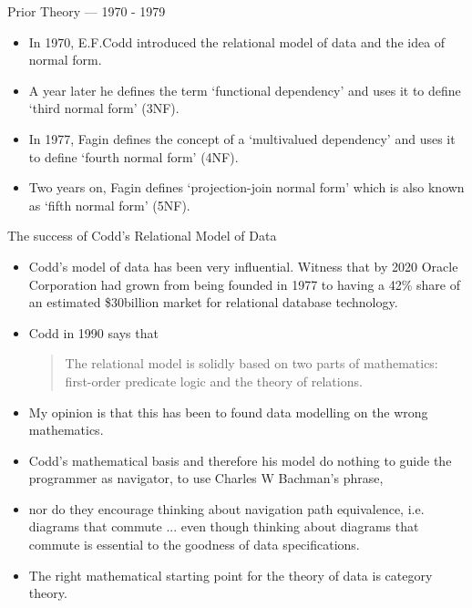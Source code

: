 
\begin{frame}{Prior Theory --- 1970 - 1979}
\begin{itemize}
\item In 1970, E.F.Codd introduced the relational model of data and the idea of normal form.
\item A year later he defines the term `functional dependency' and  uses it to define `third normal form' (3NF).
\item In 1977, Fagin defines the concept of a `multivalued dependency' and uses it to define `fourth normal form' (4NF).
\item Two years on, Fagin defines `projection-join normal form' which is also known as `fifth normal form' (5NF).
\end{itemize} 
\end{frame}

\iffalse
\begin{frame}{Inclusion Normal Forms}
Ling and Goh 1992 
\begin{quote}
Since
classical normal forms (including the Improved 3NF)
have failed to consider the effects of INDs on the structure
of a database, they are inadequate in characterizing a
database scheme which is truly devoid of redundancies.
In consideration of the above, we propose a new normal
form, called Inclusion Normal Form (IN-NF)...
\end{quote}
\end{frame}
\fi

\begin{frame}{The success of Codd's Relational Model of Data}
\begin{itemize}
\item Codd's model of data has been very influential. Witness that by 2020 Oracle Corporation had grown from being founded in 1977 to having  a 42\% share of an estimated \$30billion market for relational database technology.  
\item Codd in 1990 says that
\begin{quote}
The relational model is solidly based on two parts of mathematics: 
first-order predicate logic and the theory of relations.
\end{quote}
\item My opinion is that this has been to found data modelling on the wrong mathematics. 
\item Codd's mathematical basis and therefore his  model  do nothing to guide the programmer as navigator, to use Charles W Bachman's phrase, 
\item nor do they encourage thinking about navigation path equivalence, i.e. diagrams that commute ... even though thinking about diagrams that commute is essential to the goodness of data specifications.
\item The right mathematical starting point for the theory of data is category theory.
\end{itemize}
\end{frame}
 



